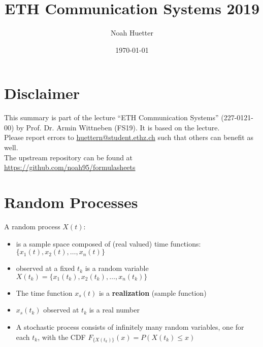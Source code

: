 \documentclass[a4paper, fontsize=8pt, landscape, DIV=1]{scrartcl}
\title{ETH Communication Systems 2019}
\author{Noah Huetter}
\date{\today}
\begin{document}
\setcounter{page}{0}
\setcounter{secnumdepth}{2} %
\begin{multicols*}{4}
	\section*{Disclaimer}
	This summary is part of the lecture ``ETH Communication Systems'' (227-0121-00) by Prof. Dr. Armin Wittneben (FS19). It is based on the lecture. \\[6pt]
	Please report errors to \href{mailto:huettern@student.ethz.ch}{huettern@student.ethz.ch} such that others can benefit as well.\\[6pt]	
  The upstream repository can be found at \href{https://github.com/noah95/formulasheets}{https://github.com/noah95/formulasheets}
	\vfill\null
  \columnbreak
  \tableofcontents
  \vfill\null
	\pagebreak
  \maketitle 
  \setcounter{page}{1}
  \thispagestyle{fancy}

  \section{Random Processes}
  A random process $X(t)$:
  \begin{itemize}
    \item is a sample space composed of (real valued) time functions: 
      $\{x_1(t), x_2(t), \dots, x_n(t)\}$
    \item observed at a fixed $t_k$ is a random variable 
      $X(t_k) = \{x_1(t_k), x_2(t_k), \dots, x_n(t_k)\}$
    \item The time function $x_s(t)$ is a \textbf{realization} (sample function)
    \item $x_s(t_k)$ observed at $t_k$ is a real number
    \item A stochastic process consists of infinitely many random variables, 
      one for each $t_k$, with the CDF $F_{\{X(t_k)\}}(x) = P(X(t_k)\leq x)$
  \end{itemize}



\end{multicols*}
\end{document}
